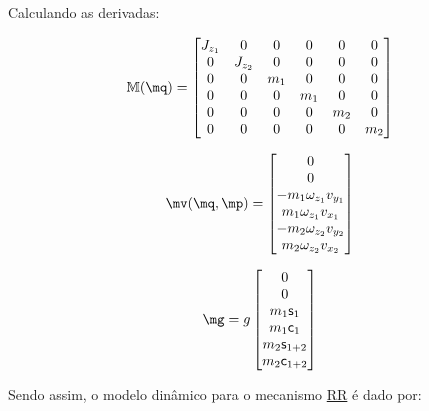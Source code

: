 \begin{itemize}
\begin{itemize}
	Calculando as derivadas:
	
	\begin{equation}
	\mM(\mq) =
	\begin{bmatrix}
	J_{z_1} & 0 & 0 & 0 & 0 & 0 \\
	0 & J_{z_2} & 0 & 0 & 0 & 0 \\
	0 & 0 & m_1 & 0 & 0 & 0 \\
	0 & 0 & 0 & m_1 & 0 & 0 \\
	0 & 0 & 0 & 0 & m_2 & 0 \\
	0 & 0 & 0 & 0 & 0 & m_2 \\
	\end{bmatrix}
	\end{equation}
	
	\begin{equation}
	\mv(\mq,\mp) =
	\begin{bmatrix}
	0 \\
	0 \\
	-m_1 \omega_{z_1} v_{y_1} \\
	m_1 \omega_{z_1} v_{x_1} \\
	-m_2 \omega_{z_2} v_{y_2} \\
	m_2 \omega_{z_2} v_{x_2} \\
	\end{bmatrix}
	\end{equation}
	
	\begin{equation}
	\mg =
	g \begin{bmatrix}
	0 \\
	0 \\
	m_1  \ssin_1 \\
	m_1  \ccos_1 \\
	m_2  \ssin_{1+2} \\
	m_2  \ccos_{1+2}\\
	\end{bmatrix}
	\end{equation}
	
	Sendo assim, o modelo dinâmico para o mecanismo \underline{R}\underline{R} é dado por:
	

\end{itemize}
\end{itemize}
